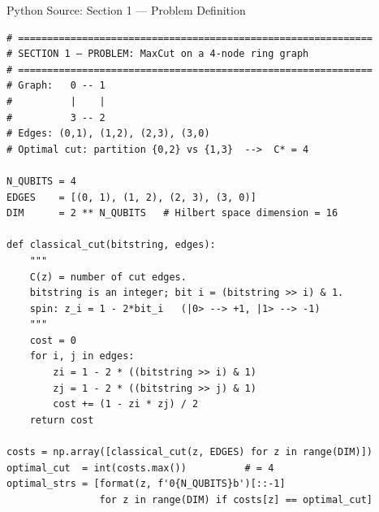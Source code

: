 \documentclass{beamer}
\begin{document}
\begin{frame}{Python Source: Section 1 — Problem Definition}
\footnotesize
\begin{verbatim}
# =============================================================
# SECTION 1 — PROBLEM: MaxCut on a 4-node ring graph
# =============================================================
# Graph:   0 -- 1
#          |    |
#          3 -- 2
# Edges: (0,1), (1,2), (2,3), (3,0)
# Optimal cut: partition {0,2} vs {1,3}  -->  C* = 4

N_QUBITS = 4
EDGES    = [(0, 1), (1, 2), (2, 3), (3, 0)]
DIM      = 2 ** N_QUBITS   # Hilbert space dimension = 16

def classical_cut(bitstring, edges):
    """
    C(z) = number of cut edges.
    bitstring is an integer; bit i = (bitstring >> i) & 1.
    spin: z_i = 1 - 2*bit_i   (|0> --> +1, |1> --> -1)
    """
    cost = 0
    for i, j in edges:
        zi = 1 - 2 * ((bitstring >> i) & 1)
        zj = 1 - 2 * ((bitstring >> j) & 1)
        cost += (1 - zi * zj) / 2
    return cost

costs = np.array([classical_cut(z, EDGES) for z in range(DIM)])
optimal_cut  = int(costs.max())          # = 4
optimal_strs = [format(z, f'0{N_QUBITS}b')[::-1]
                for z in range(DIM) if costs[z] == optimal_cut]
\end{verbatim}
\end{frame}

\end{document}
